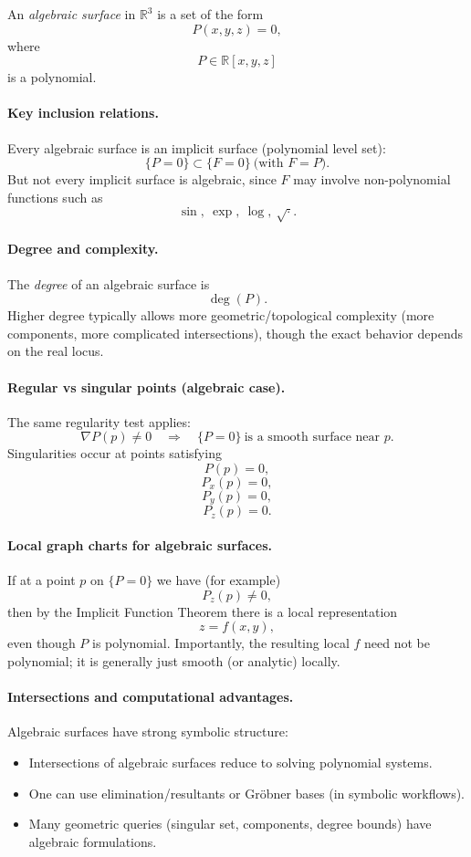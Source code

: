 \documentclass[12pt,a4paper]{article}
\theoremstyle{plain}
\theoremstyle{definition}      %
\begin{document}
An \emph{algebraic surface} in $\mathbb{R}^3$ is a set of the form
\[
P(x,y,z)=0,
\]
where
\[
P\in\mathbb{R}[x,y,z]
\]
is a polynomial.

\paragraph{Key inclusion relations.}
Every algebraic surface is an implicit surface (polynomial level set):
\[
\{P=0\}\subset \{F=0\}\ \text{(with }F=P\text{)}.
\]
But not every implicit surface is algebraic, since $F$ may involve non-polynomial functions such as
\[
\sin,\ \exp,\ \log,\ \sqrt{\cdot}.
\]

\paragraph{Degree and complexity.}
The \emph{degree} of an algebraic surface is
\[
\deg(P).
\]
Higher degree typically allows more geometric/topological complexity (more components, more complicated intersections), though the exact behavior depends on the real locus.

\paragraph{Regular vs singular points (algebraic case).}
The same regularity test applies:
\[
\nabla P(p)\neq 0
\quad\Rightarrow\quad
\{P=0\}\ \text{is a smooth surface near }p.
\]
Singularities occur at points satisfying
\[
P(p)=0,
\]
\[
P_x(p)=0,
\]
\[
P_y(p)=0,
\]
\[
P_z(p)=0.
\]

\paragraph{Local graph charts for algebraic surfaces.}
If at a point $p$ on $\{P=0\}$ we have (for example)
\[
P_z(p)\neq 0,
\]
then by the Implicit Function Theorem there is a local representation
\[
z=f(x,y),
\]
even though $P$ is polynomial. Importantly, the resulting local $f$ need not be polynomial; it is generally just smooth (or analytic) locally.

\paragraph{Intersections and computational advantages.}
Algebraic surfaces have strong symbolic structure:
\begin{itemize}
	\item Intersections of algebraic surfaces reduce to solving polynomial systems.
	\item One can use elimination/resultants or Gröbner bases (in symbolic workflows).
	\item Many geometric queries (singular set, components, degree bounds) have algebraic formulations.
\end{itemize}
\end{document}
